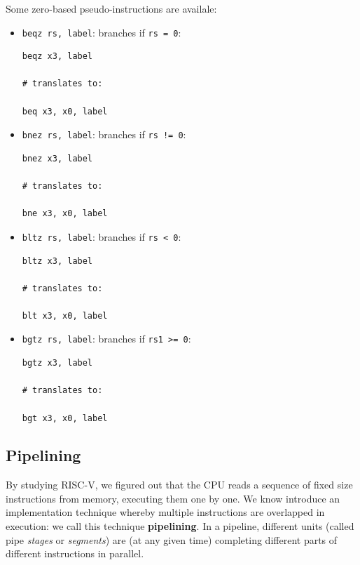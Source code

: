 \documentclass[a4paper,11pt]{article}
\begin{document}
Some zero-based pseudo-instructions are availale:
\begin{itemize}
	\item \lstinline|beqz rs, label|: branches if \lstinline|rs = 0|:
	      \begin{lstlisting}[language=riscv, style=codestyle]	
beqz x3, label

# translates to:

beq x3, x0, label
\end{lstlisting}

	\item \lstinline|bnez rs, label|: branches if \lstinline|rs != 0|:
	      \begin{lstlisting}[language=riscv, style=codestyle]	
bnez x3, label

# translates to:

bne x3, x0, label
\end{lstlisting}

	\item \lstinline|bltz rs, label|: branches if \lstinline|rs < 0|:
	      \begin{lstlisting}[language=riscv, style=codestyle]	
bltz x3, label

# translates to:

blt x3, x0, label
\end{lstlisting}

	\item \lstinline|bgtz rs, label|: branches if \lstinline|rs1 >= 0|:
	      \begin{lstlisting}[language=riscv, style=codestyle]	
bgtz x3, label

# translates to:

bgt x3, x0, label
\end{lstlisting}

\end{itemize}

\subsection{Pipelining}

By studying RISC-V, we figured out that the CPU reads a sequence of fixed size instructions from memory, executing them one by one.
We know introduce an implementation technique whereby multiple instructions are overlapped in execution: we call this technique \textbf{pipelining}.
In a pipeline, different units (called pipe \textit{stages} or \textit{segments}) are (at any given time) completing different parts of different instructions in parallel.
\end{document}
